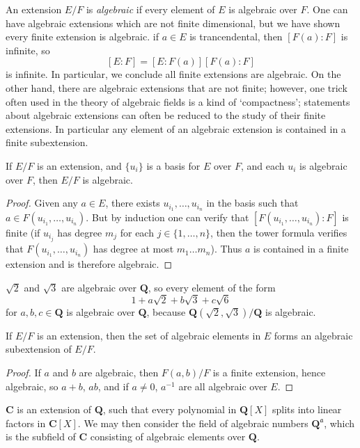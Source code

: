 An extension $E/F$ is {\it algebraic} if every element of $E$ is algebraic over $F$. One can have algebraic extensions which are not finite dimensional, but we have shown every finite extension is algebraic. if $a \in E$ is trancendental, then $[F(a): F]$ is infinite, so
%
\[ [E:F] = [E:F(a)][F(a):F] \]
%
is infinite. In particular, we conclude all finite extensions are algebraic. On the other hand, there are algebraic extensions that are not finite; however, one trick often used in the theory of algebraic fields is a kind of `compactness'; statements about algebraic extensions can often be reduced to the study of their finite extensions. In particular any element of an algebraic extension is contained in a finite subextension.

\begin{theorem}
    If $E/F$ is an extension, and $\{ u_i \}$ is a basis for $E$ over $F$, and each $u_i$ is algebraic over $F$, then $E/F$ is algebraic.
\end{theorem}
\begin{proof}
	Given any $a \in E$, there exists $u_{i_1}, \dots, u_{i_n}$ in the basis such that $a \in F(u_{i_1},\dots,u_{i_n})$. But by induction one can verify that $[F(u_{i_1},\dots,u_{i_n}): F]$ is finite (if $u_{i_j}$ has degree $m_j$ for each $j \in \{ 1, \dots, n \}$, then the tower formula verifies that $F(u_{i_1},\dots,u_{i_n})$ has degree at most $m_1 \dots m_n$). Thus $a$ is contained in a finite extension and is therefore algebraic.
\end{proof}

\begin{example}
    $\sqrt{2}$ and $\sqrt{3}$ are algebraic over $\mathbf{Q}$, so every element of the form
    \[ 1 + a \sqrt{2} + b \sqrt{3} + c \sqrt{6} \]
    for $a,b,c \in \mathbf{Q}$ is algebraic over $\mathbf{Q}$, because $\mathbf{Q}(\sqrt{2},\sqrt{3})/\mathbf{Q}$ is algebraic.
\end{example}

\begin{theorem}
    If $E/F$ is an extension, then the set of algebraic elements in $E$ forms an algebraic subextension of $E/F$.
\end{theorem}
\begin{proof}
    If $a$ and $b$ are algebraic, then $F(a,b)/F$ is a finite extension, hence algebraic, so $a + b$, $ab$, and if $a \neq 0$, $a^{-1}$ are all algebraic over $E$.
\end{proof}

\begin{example}
    $\mathbf{C}$ is an extension of $\mathbf{Q}$, such that every polynomial in $\mathbf{Q}[X]$ splits into linear factors in $\mathbf{C}[X]$. We may then consider the field of algebraic numbers $\mathbf{Q}^{\mathfrak{a}}$, which is the subfield of $\mathbf{C}$ consisting of algebraic elements over $\mathbf{Q}$.
\end{example}

